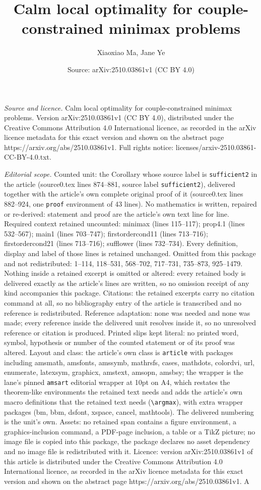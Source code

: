 \documentclass[10pt,a4paper]{amsart}
\title[Calm local optimality for couple-constrained minimax problem]{Calm local optimality for couple-constrained minimax problems}
\author{Xiaoxiao Ma, Jane Ye}
\date{Source: arXiv:2510.03861v1 (CC BY 4.0)}
\begin{document}
\maketitle

\noindent\emph{Source and licence.} Calm local optimality for couple-constrained minimax problems. Version arXiv:2510.03861v1 (CC BY 4.0), distributed under the Creative Commons Attribution 4.0 International licence, as recorded in the arXiv licence metadata for this exact version and shown on the abstract page https://arxiv.org/abs/2510.03861v1. Full rights notice: licenses/arxiv-2510.03861-CC-BY-4.0.txt.\par\smallskip

\noindent\textit{Editorial scope.} Counted unit: the Corollary whose source label is \texttt{sufficient2} in the article (source0.tex lines 874--881, source label \texttt{sufficient2}), delivered together with the article's own complete original proof of it (source0.tex lines 882--924, one \texttt{proof} environment of 43 lines). No mathematics is written, repaired or re-derived: statement and proof are the article's own text line for line. Required context retained uncounted: minimax (lines 115--117); prop4.1 (lines 532--567); main1 (lines 703--747); firstordercond11 (lines 713--716); firstordercond21 (lines 713--716); sufflower (lines 732--734). Every definition, display and label of those lines is retained unchanged. Omitted from this package and not redistributed: 1--114, 118--531, 568--702, 717--731, 735--873, 925--1479. Nothing inside a retained excerpt is omitted or altered: every retained body is delivered exactly as the article's lines are written, so no omission receipt of any kind accompanies this package. Citations: the retained excerpts carry no citation command at all, so no bibliography entry of the article is transcribed and no reference is redistributed. Reference adaptation: none was needed and none was made; every reference inside the delivered unit resolves inside it, so no unresolved reference or citation is produced. Printed slips kept literal: no printed word, symbol, hypothesis or number of the counted statement or of its proof was altered. Layout and class: the article's own class is \texttt{article} with packages including amsmath, amsfonts, amssymb, mathrsfs, cases, mathdots, colordvi, url, enumerate, latexsym, graphicx, amstext, amsopn, amsbsy; the wrapper is the lane's pinned \texttt{amsart} editorial wrapper at 10pt on A4, which restates the theorem-like environments the retained text needs and adds the article's own macro definitions that the retained text needs (\texttt{\textbackslash argmax}), with extra wrapper packages (bm, bbm, dsfont, xspace, cancel, mathtools). The delivered numbering is the unit's own. Assets: no retained span contains a figure environment, a graphics-inclusion command, a PDF-page inclusion, a table or a TikZ picture; no image file is copied into this package, the package declares no asset dependency and no image file is redistributed with it. Licence: version arXiv:2510.03861v1 of this article is distributed under the Creative Commons Attribution 4.0 International licence, as recorded in the arXiv licence metadata for this exact version and shown on the abstract page https://arxiv.org/abs/2510.03861v1. A 
\end{document}
